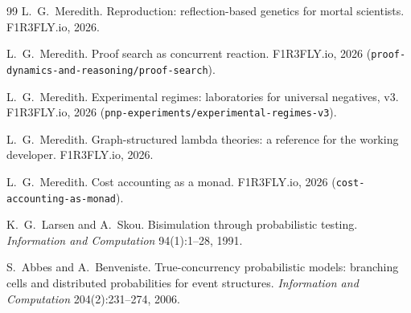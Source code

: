 \documentclass[11pt]{article}
\theoremstyle{plain}
\theoremstyle{definition}
\theoremstyle{remark}
\begin{document}
\begin{thebibliography}{99}
 L.~G.~Meredith.
\newblock Reproduction: reflection-based genetics for mortal scientists.
\newblock F1R3FLY.io, 2026.

 L.~G.~Meredith.
\newblock Proof search as concurrent reaction.
\newblock F1R3FLY.io, 2026 (\texttt{proof-dynamics-and-reasoning/proof-search}).

 L.~G.~Meredith.
\newblock Experimental regimes: laboratories for universal negatives, v3.
\newblock F1R3FLY.io, 2026 (\texttt{pnp-experiments/experimental-regimes-v3}).

 L.~G.~Meredith.
\newblock Graph-structured lambda theories: a reference for the working
developer.
\newblock F1R3FLY.io, 2026.

 L.~G.~Meredith.
\newblock Cost accounting as a monad.
\newblock F1R3FLY.io, 2026 (\texttt{cost-accounting-as-monad}).

 K.~G.~Larsen and A.~Skou.
\newblock Bisimulation through probabilistic testing.
\newblock \emph{Information and Computation} 94(1):1--28, 1991.

 S.~Abbes and A.~Benveniste.
\newblock True-concurrency probabilistic models: branching cells and
distributed probabilities for event structures.
\newblock \emph{Information and Computation} 204(2):231--274, 2006.

\end{thebibliography}
\end{document}
